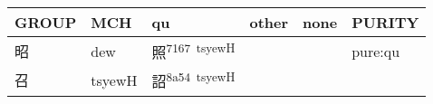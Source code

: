 \documentclass[14pt,a4paper]{scrartcl}
\begin{document}
\begin{longtable}[c]{@{}llllll@{}}
\toprule
\begin{minipage}[b]{0.14\columnwidth}\raggedright\strut
GROUP
\strut\end{minipage} &
\begin{minipage}[b]{0.14\columnwidth}\raggedright\strut
MCH
\strut\end{minipage} &
\begin{minipage}[b]{0.14\columnwidth}\raggedright\strut
qu
\strut\end{minipage} &
\begin{minipage}[b]{0.14\columnwidth}\raggedright\strut
other
\strut\end{minipage} &
\begin{minipage}[b]{0.14\columnwidth}\raggedright\strut
none
\strut\end{minipage} &
\begin{minipage}[b]{0.14\columnwidth}\raggedright\strut
PURITY
\strut\end{minipage}\tabularnewline
\midrule
\endhead
\begin{minipage}[t]{0.14\columnwidth}\raggedright\strut
昭
\strut\end{minipage} &
\begin{minipage}[t]{0.14\columnwidth}\raggedright\strut
dew
\strut\end{minipage} &
\begin{minipage}[t]{0.14\columnwidth}\raggedright\strut
照\textsuperscript{7167~tsyewH}
\strut\end{minipage} &
\begin{minipage}[t]{0.14\columnwidth}\raggedright\strut
\strut\end{minipage} &
\begin{minipage}[t]{0.14\columnwidth}\raggedright\strut
\strut\end{minipage} &
\begin{minipage}[t]{0.14\columnwidth}\raggedright\strut
pure:qu
\strut\end{minipage}\tabularnewline
\begin{minipage}[t]{0.14\columnwidth}\raggedright\strut
召
\strut\end{minipage} &
\begin{minipage}[t]{0.14\columnwidth}\raggedright\strut
tsyewH
\strut\end{minipage} &
\begin{minipage}[t]{0.14\columnwidth}\raggedright\strut
詔\textsuperscript{8a54~tsyewH}
\strut\end{minipage} &

\end{longtable}
\end{document}
